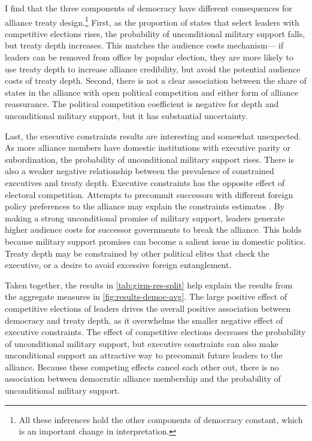 \documentclass[12pt]{article}
\begin{document}
I find that the three components of democracy have different consequences for alliance treaty design.\footnote{All these inferences hold the other components of democracy constant, which is an important change in interpretation.}
First, as the proportion of states that select leaders with competitive elections rises, the probability of unconditional military support falls, but treaty depth increases.
This matches the audience costs mechanism--- if leaders can be removed from office by popular election, they are more likely to use treaty depth to increase alliance credibility, but avoid the potential audience costs of treaty depth. 
Second, there is not a clear association between the share of states in the alliance with open political competition and either form of alliance reassurance.
The political competition coefficient is negative for depth and unconditional military support, but it has substantial uncertainty.


Last, the executive constraints results are interesting and somewhat unexpected. 
As more alliance members have domestic institutions with executive parity or subordination, the probability of unconditional military support rises. 
There is also a weaker negative relationship between the prevalence of constrained executives and treaty depth. 
Executive constraints has the opposite effect of electoral competition. 
Attempts to precommit successors with different foreign policy preferences to the alliance may explain the constraints estimates \cite{Mattes2012a}. 
By making a strong unconditional promise of military support, leaders generate higher audience costs for successor governments to break the alliance. 
This holds because military support promises can become a salient issue in domestic politics. 
Treaty depth may be constrained by other political elites that check the executive, or a desire to avoid excessive foreign entanglement.  


Taken together, the results in \autoref{tab:gjrm-res-split} help explain the results from the aggregate measures in \autoref{fig:results-democ-avg}. 
The large positive effect of competitive elections of leaders drives the overall positive association between democracy and treaty depth, as it overwhelms the smaller negative effect of executive constraints. 
The effect of competitive elections decreases the probability of unconditional military support, but executive constraints can also make unconditional support an attractive way to precommit future leaders to the alliance. 
Because these competing effects cancel each other out, there is no association between democratic alliance membership and the probability of unconditional military support. 
\end{document}
